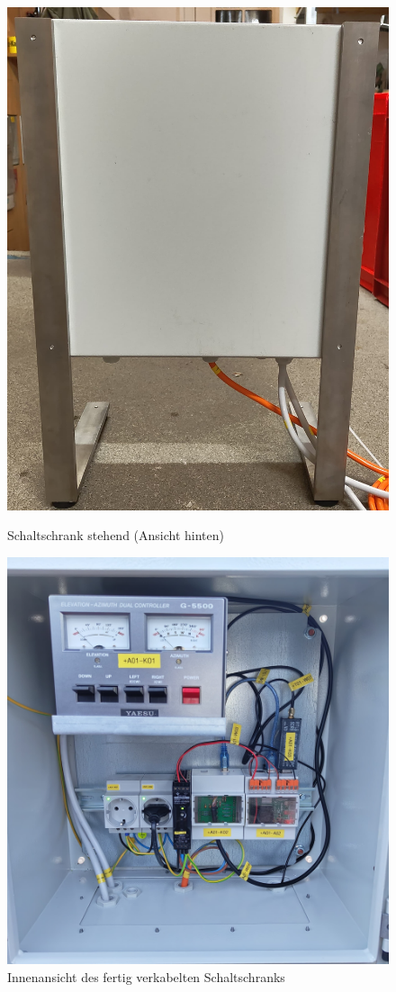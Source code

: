 \begin{figure}[H]
\begin{minipage}[b]{.4\linewidth}
		\includegraphics[width=\linewidth]{../ref/Schaltschrank_stehend_hinten.jpeg}
		\label{fig:schaltschrankstehendhinten}
		\caption{Schaltschrank stehend (Ansicht hinten)}
	\end{minipage}
\end{figure}

\begin{figure}[H]
	\centering
	\includegraphics[width=.5\linewidth]{../ref/schaltschrank_innen.jpeg}
	\caption{Innenansicht des fertig verkabelten Schaltschranks}
	\label{fig:schaltschrankinnen}
\end{figure}

